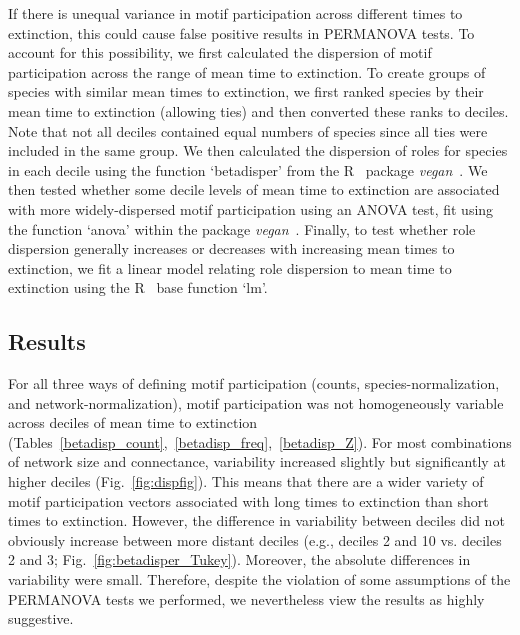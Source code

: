 \documentclass[12pt]{article}
\begin{document}
        If there is unequal variance in motif participation across different times to extinction, this could cause false positive results in PERMANOVA tests.
        To account for this possibility, we first calculated the dispersion of motif participation across the range of mean time to extinction.
        To create groups of species with similar mean times to extinction, we first ranked species by their mean time to extinction (allowing ties) and then converted these ranks to deciles. 
        Note that not all deciles contained equal numbers of species since all ties were included in the same group.
        We then calculated the dispersion of roles for species in each decile using the function `betadisper' from the R~\citep{R} package \emph{vegan}~\citep{vegan}.
        We then tested whether some decile levels of mean time to extinction are associated with more widely-dispersed motif participation using an ANOVA test, fit using the function `anova' within the package \emph{vegan}~\citep{vegan}.
        Finally, to test whether role dispersion generally increases or decreases with increasing mean times to extinction, we fit a linear model relating role dispersion to mean time to extinction using the R~\citep{R} base function `lm'.


	\subsection*{Results}

        For all three ways of defining motif participation (counts, species-normalization, and network-normalization), motif participation was not homogeneously variable across deciles of mean time to extinction (Tables~\ref{betadisp_count},~\ref{betadisp_freq},~\ref{betadisp_Z}). 
        For most combinations of network size and connectance, variability increased slightly but significantly at higher deciles (Fig.~\ref{fig:dispfig}).
        This means that there are a wider variety of motif participation vectors associated with long times to extinction than short times to extinction.
        However, the difference in variability between deciles did not obviously increase between more distant deciles (e.g., deciles 2 and 10 vs. deciles 2 and 3; Fig.~\ref{fig:betadisper_Tukey}).
        Moreover, the absolute differences in variability were small.
        Therefore, despite the violation of some assumptions of the PERMANOVA tests we performed, we nevertheless view the results as highly suggestive.
\end{document}
